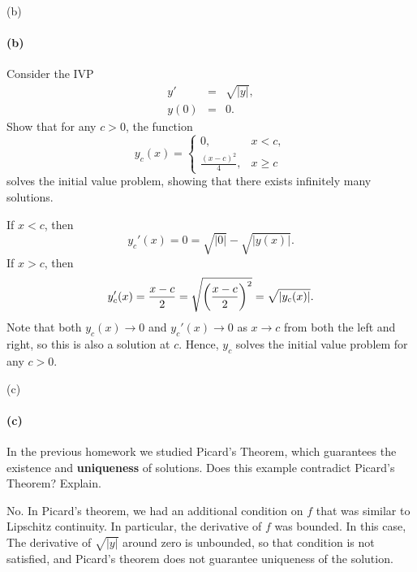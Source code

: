 \documentclass[12pt]{article}
\newenvironment{fullbox}{\begin{lrbox}{\savefullbox}\begin{minipage}{\dimexpr\textwidth-2\fboxsep\relax}}{\end{minipage}\end{lrbox}\begin{center}\framebox[\textwidth]{\usebox{\savefullbox}}\end{center}}
\newenvironment{pbox}[1][]{\begin{fullbox}\ifx#1\empty\else\paragraph{#1}\fi}{\end{fullbox}}
\theoremstyle{definition}
\begin{document}
\newpage
\begin{pbox}[(b)]
    Consider the IVP
    \begin{eqnarray}
    y'&=&\sqrt{|y|},\\
    y(0)&=& 0.
    \end{eqnarray}
    Show that for any $c>0$, the function 
    \begin{equation}
    y_c(x) = \left \{ \begin{array}{lr}
    0,&  x < c,\\
    \frac{(x-c)^2}{4},& x\ge c
    \end{array}\right .
    \end{equation}
    solves the initial value problem, showing that there exists infinitely many solutions.
\end{pbox}

If $x < c$, then
\[
    y_c'(x) = 0 = \sqrt{|0|} - \sqrt{|y(x)|}.
\]
If $x > c$, then
\[
    y_c'(x)
        = \frac{x - c}{2}
        = \sqrt{\qty(\frac{x-c}{2})^2}
        = \sqrt{|y_c(x)|}.
\]
Note that both $y_c(x) \to 0$ and $y_c'(x) \to 0$ as $x \to c$ from both the left and right, so this is also a solution at $c$. Hence, $y_c$ solves the initial value problem for any $c > 0$.

\begin{pbox}[(c)]
    In the previous homework we studied Picard's Theorem, which guarantees the existence and {\bf uniqueness} of solutions. Does this example contradict Picard's Theorem? Explain.
\end{pbox}

No. In Picard's theorem, we had an additional condition on $f$ that was similar to Lipschitz continuity. In particular, the derivative of $f$ was bounded. In this case, The derivative of $\sqrt{|y|}$ around zero is unbounded, so that condition is not satisfied, and Picard's theorem does not guarantee uniqueness of the solution.
\end{document}
